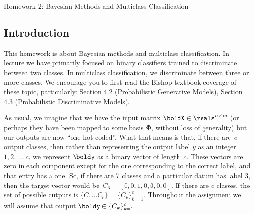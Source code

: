 \documentclass[submit]{harvardml}
\begin{document}
\newcommand{\bx}{\mathbf{x}} %
\newcommand{\bX}{\mathbf{X}} %
\newcommand{\by}{\mathbf{y}} %

\newcommand{\bw}{\mathbf{w}} %
\newcommand{\bS}{\mathbf{S}} %

\newcommand{\mBI}{\mathbb{I}_{ik}} %

\newcommand{\bvar}{\mathbf{\sigma}^2} %
\newcommand{\bSig}{\mathbf{\Sigma}} %
\newcommand{\lsum}{\mathlarger{\sum}} %




{
  \begin{center}
{\Large Homework 2: Bayesian Methods and Multiclass Classification}\\
\end{center}
}
\subsection*{Introduction}

This homework is about Bayesian methods 
and  multiclass classification. In lecture we have
primarily focused on binary classifiers trained to discriminate
between two classes. In multiclass classification, we discriminate
between three or more classes. We encourage you to first read the
Bishop textbook coverage of these topic, particularly: Section 4.2
(Probabilistic Generative Models), Section 4.3 (Probabilistic
Discriminative Models).


As usual, we imagine that we have the input matrix $\boldX \in
\reals^{n \times m}$ (or perhaps they have been mapped to some basis
$\bm{\Phi}$, without loss of generality) but our outputs are now
``one-hot coded''.  What that means is that, if there are~$c$ output
classes, then rather than representing the output label $y$ as an
integer~${1,2,\ldots,c}$, we represent $\boldy$ as a binary vector of
length~$c$. These vectors are zero in each
component except for the one corresponding to the correct label, and
that entry has a one.  So, if there are 7 classes and a particular
datum has label 3, then the target vector would be~${C_3 = [0,0,1,0,0,0,0]}$. 
If there are $c$ classes, the set of possible outputs is $\{C_1 \ldots C_c \} = \{C_k\}_{k=1}^c$.
Throughout the assignment we will assume
that output $\boldy \in \{C_k\}_{k=1}^c$.\\
\end{document}
